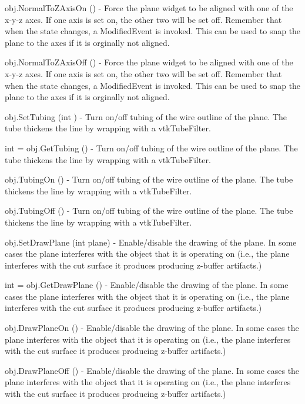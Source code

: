\begin{DoxyItemize}
\item {\ttfamily obj.\-Normal\-To\-Z\-Axis\-On ()} -\/ Force the plane widget to be aligned with one of the x-\/y-\/z axes. If one axis is set on, the other two will be set off. Remember that when the state changes, a Modified\-Event is invoked. This can be used to snap the plane to the axes if it is orginally not aligned.  
\item {\ttfamily obj.\-Normal\-To\-Z\-Axis\-Off ()} -\/ Force the plane widget to be aligned with one of the x-\/y-\/z axes. If one axis is set on, the other two will be set off. Remember that when the state changes, a Modified\-Event is invoked. This can be used to snap the plane to the axes if it is orginally not aligned.  
\item {\ttfamily obj.\-Set\-Tubing (int )} -\/ Turn on/off tubing of the wire outline of the plane. The tube thickens the line by wrapping with a vtk\-Tube\-Filter.  
\item {\ttfamily int = obj.\-Get\-Tubing ()} -\/ Turn on/off tubing of the wire outline of the plane. The tube thickens the line by wrapping with a vtk\-Tube\-Filter.  
\item {\ttfamily obj.\-Tubing\-On ()} -\/ Turn on/off tubing of the wire outline of the plane. The tube thickens the line by wrapping with a vtk\-Tube\-Filter.  
\item {\ttfamily obj.\-Tubing\-Off ()} -\/ Turn on/off tubing of the wire outline of the plane. The tube thickens the line by wrapping with a vtk\-Tube\-Filter.  
\item {\ttfamily obj.\-Set\-Draw\-Plane (int plane)} -\/ Enable/disable the drawing of the plane. In some cases the plane interferes with the object that it is operating on (i.\-e., the plane interferes with the cut surface it produces producing z-\/buffer artifacts.)  
\item {\ttfamily int = obj.\-Get\-Draw\-Plane ()} -\/ Enable/disable the drawing of the plane. In some cases the plane interferes with the object that it is operating on (i.\-e., the plane interferes with the cut surface it produces producing z-\/buffer artifacts.)  
\item {\ttfamily obj.\-Draw\-Plane\-On ()} -\/ Enable/disable the drawing of the plane. In some cases the plane interferes with the object that it is operating on (i.\-e., the plane interferes with the cut surface it produces producing z-\/buffer artifacts.)  
\item {\ttfamily obj.\-Draw\-Plane\-Off ()} -\/ Enable/disable the drawing of the plane. In some cases the plane interferes with the object that it is operating on (i.\-e., the plane interferes with the cut surface it produces producing z-\/buffer artifacts.)  

\end{DoxyItemize}
